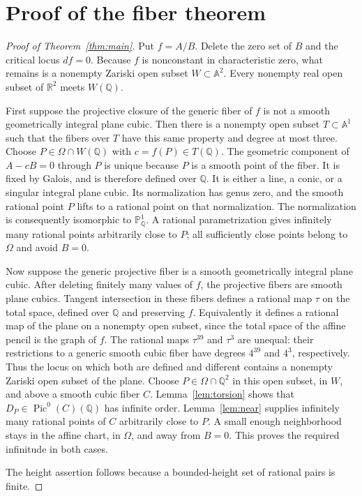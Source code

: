 \documentclass[11pt]{article}
\theoremstyle{remark}\newtheorem{remark}[theorem]{Remark}
\newcommand{\Q}{\mathbb Q}\newcommand{\R}{\mathbb R}
\newcommand{\PP}{\mathbb P}\newcommand{\Affine}{\mathbb A}
\begin{document}
\section{Proof of the fiber theorem}
\begin{proof}[Proof of Theorem~\ref{thm:main}]
Put $f=A/B$.  Delete the zero set of $B$ and the critical locus $df=0$.
Because $f$ is nonconstant in characteristic zero, what remains is a
nonempty Zariski open subset $W\subset\Affine^2$.  Every nonempty real
open subset of $\R^2$ meets $W(\Q)$.

First suppose the projective closure of the generic fiber of $f$ is not
a smooth geometrically integral plane cubic.  Then there is a nonempty
open subset $T\subset\Affine^1$ such that the fibers over $T$ have this same
property and degree at most three.  Choose
$P\in\Omega\cap W(\Q)$ with $c=f(P)\in T(\Q)$.
The geometric component of $A-cB=0$ through $P$ is unique because $P$ is
a smooth point of the fiber.  It is fixed by Galois, and is therefore
defined over $\Q$.  It is either a line, a conic, or a singular integral
plane cubic.  Its normalization has genus zero, and the smooth rational
point $P$ lifts to a rational point on that normalization.  The
normalization is consequently isomorphic to $\PP^1_\Q$.
A rational parametrization gives infinitely many rational points
arbitrarily close to $P$; all sufficiently close points belong to
$\Omega$ and avoid $B=0$.

Now suppose the generic projective fiber is a smooth geometrically
integral plane cubic.  After deleting finitely many values of $f$,
the projective fibers are smooth plane cubics.  Tangent intersection in
these fibers defines a rational map $\tau$ on the total space, defined
over $\Q$ and preserving $f$.  Equivalently it defines a rational map
of the plane on a nonempty open subset, since the total space of the
affine pencil is the graph of $f$.
The rational maps $\tau^{39}$ and $\tau^3$ are unequal: their
restrictions to a generic smooth cubic fiber have degrees $4^{39}$ and
$4^3$, respectively.  Thus the locus on which both are defined and
different contains a nonempty Zariski open subset of the plane.
Choose $P\in\Omega\cap\Q^2$ in this open subset, in $W$, and above a
smooth cubic fiber $C$.
Lemma~\ref{lem:torsion} shows that $D_P\in\operatorname{Pic}^0(C)(\Q)$
has infinite order.  Lemma~\ref{lem:near} supplies infinitely many
rational points of $C$ arbitrarily close to $P$.  A small enough
neighborhood stays in the affine chart, in $\Omega$, and away from
$B=0$.  This proves the required infinitude in both cases.

The height assertion follows because a bounded-height set of rational
pairs is finite.
\end{proof}
\end{document}
